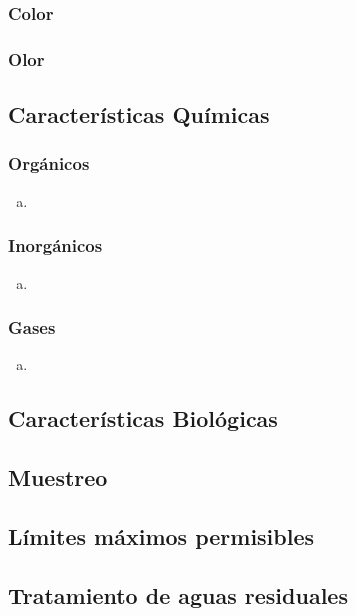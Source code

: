 \subsubsection{Color}
\subsubsection{Olor}
\subsection{Características Químicas}
\subsubsection{Orgánicos}
\begin{enumerate}[a.]
	\item 
\end{enumerate}
\subsubsection{Inorgánicos}
\begin{enumerate}[a.]
	\item 
\end{enumerate}
\subsubsection{Gases}
\begin{enumerate}[a.]
	\item 
\end{enumerate}
\subsection{Características Biológicas}
\subsection{Muestreo}
\subsection{Límites máximos permisibles}\label{NOM2021}
\subsection{Tratamiento de aguas residuales}

